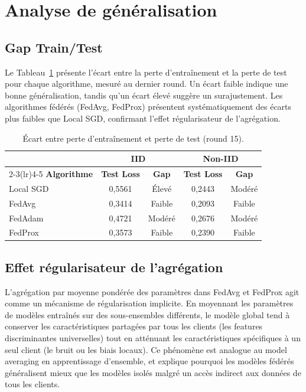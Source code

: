\documentclass[12pt,a4paper]{report}
\begin{document}
\section{Analyse de g\'{e}n\'{e}ralisation}

\subsection{Gap Train/Test}

Le Tableau~\ref{tab:gap_traintest} pr\'{e}sente l'\'{e}cart entre la perte d'entra\^{i}nement et la perte de test pour chaque algorithme, mesur\'{e} au dernier round. Un \'{e}cart faible indique une bonne g\'{e}n\'{e}ralisation, tandis qu'un \'{e}cart \'{e}lev\'{e} sugg\`{e}re un surajustement. Les algorithmes f\'{e}d\'{e}r\'{e}s (FedAvg, FedProx) pr\'{e}sentent syst\'{e}matiquement des \'{e}carts plus faibles que Local SGD, confirmant l'effet r\'{e}gularisateur de l'agr\'{e}gation.

\begin{table}[H]
\centering
\caption{\'{E}cart entre perte d'entra\^{i}nement et perte de test (round 15).}
\label{tab:gap_traintest}
\begin{tabular}{lcccc}
\toprule
& \multicolumn{2}{c}{\textbf{IID}} & \multicolumn{2}{c}{\textbf{Non-IID}} \\
\cmidrule(lr){2-3}\cmidrule(lr){4-5}
\textbf{Algorithme} & \textbf{Test Loss} & \textbf{Gap} & \textbf{Test Loss} & \textbf{Gap} \\
\midrule
Local SGD & 0,5561 & \'{E}lev\'{e} & 0,2443 & Mod\'{e}r\'{e} \\
FedAvg    & 0,3414 & Faible & 0,2093 & Faible \\
FedAdam   & 0,4721 & Mod\'{e}r\'{e} & 0,2676 & Mod\'{e}r\'{e} \\
FedProx   & 0,3573 & Faible & 0,2390 & Faible \\
\bottomrule
\end{tabular}
\end{table}

\subsection{Effet r\'{e}gularisateur de l'agr\'{e}gation}

L'agr\'{e}gation par moyenne pond\'{e}r\'{e}e des param\`{e}tres dans FedAvg et FedProx agit comme un m\'{e}canisme de r\'{e}gularisation implicite. En moyennant les param\`{e}tres de mod\`{e}les entra\^{i}n\'{e}s sur des sous-ensembles diff\'{e}rents, le mod\`{e}le global tend \`{a} conserver les caract\'{e}ristiques partag\'{e}es par tous les clients (les features discriminantes universelles) tout en att\'{e}nuant les caract\'{e}ristiques sp\'{e}cifiques \`{a} un seul client (le bruit ou les biais locaux). Ce ph\'{e}nom\`{e}ne est analogue au model averaging en apprentissage d'ensemble, et explique pourquoi les mod\`{e}les f\'{e}d\'{e}r\'{e}s g\'{e}n\'{e}ralisent mieux que les mod\`{e}les isol\'{e}s malgr\'{e} un acc\`{e}s indirect aux donn\'{e}es de tous les clients.
\end{document}
